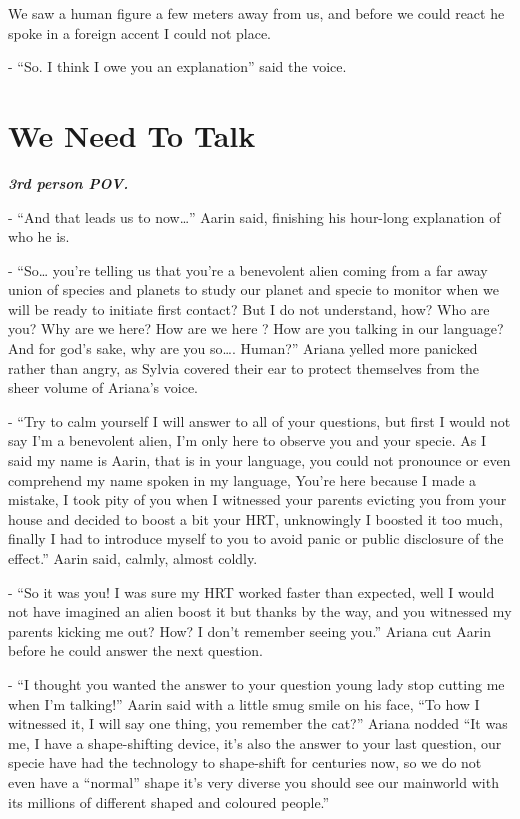 \documentclass[hidelinks,12pt,a4paper]{book}
\begin{document}
We saw a human figure a few meters away from us, and before we could react he spoke in a foreign accent I could not place.\par
\bigskip

- “So. I think I owe you an explanation” said the voice.
\chapter{We Need To Talk}
\textit{\textbf{3rd person POV.}}\par
\bigskip

- “And that leads us to now…” Aarin said, finishing his hour-long explanation of who he is.\par
\bigskip

- “So… you're telling us that you're a benevolent alien coming from a far 
away union of species and planets to study our planet and specie to monitor when we will be 
ready to initiate first contact? But I do not understand, how? Who are you? Why are we here? 
How are we here ? How are you talking in our language? And for god's sake, why are you so…. Human?” 
Ariana yelled more panicked rather than angry, as Sylvia covered their ear to protect themselves 
from the sheer volume of Ariana's voice.\par
\bigskip

- “Try to calm yourself I will answer to all of your questions, 
but first I would not say I'm a benevolent alien, I'm only here to 
observe you and your specie. As I said my name is Aarin, that is in your language, 
you could not pronounce or even comprehend my name spoken in my language, You're here because I made a mistake,
 I took pity of you when I witnessed your parents evicting you from your 
 house and decided to boost a bit your HRT, unknowingly I boosted it too much, finally I had to 
 introduce myself to you to avoid panic or public disclosure of the effect.” Aarin said, calmly, almost coldly.\par
 \bigskip

- “So it was you! I was sure my HRT worked faster than expected, well I would not have imagined an alien boost it 
but thanks by the way, and you witnessed my parents kicking me out? How? I don't remember seeing you.”
 Ariana cut Aarin before he could answer the next question.\par
 \bigskip

- “I thought you wanted the answer to your question young lady stop cutting me when I'm talking!” 
Aarin said with a little smug smile on his face, “To how I witnessed it, I will say one thing, you remember the cat?” 
Ariana nodded “It was me, I have a shape-shifting device, it's also the answer to your last question, 
our specie have had the technology to shape-shift for centuries now, so we do not even have a “normal” shape it's 
very diverse you should see our mainworld with its millions of different shaped and coloured people.”\par
\bigskip
\end{document}
